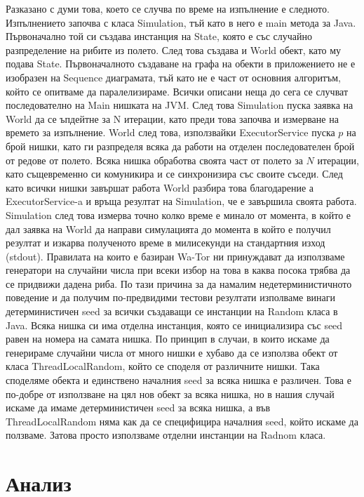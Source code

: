 \documentclass[12pt]{article}
\begin{document}
\newpage
Разказано с думи това, което се случва по време на изпълнение е следното. Изпълнението започва с класа Simulation,
тъй като в него е main метода за Java. Първоначално той си създава инстанция на State, която е със случайно
разпределение на рибите из полето. След това създава и World обект, като му подава State. Първоначалното
създаване на графа на обекти в приложението не е изобразен на Sequence диаграмата, тъй като не е част от основния
алгоритъм, който се опитваме да паралелизираме. Всички описани неща до сега се случват последователно на
Main нишката на JVM. След това Simulation пуска заявка на World да се ъпдейтне за N итерации, като преди това
започва и измерване на времето за изпълнение. World след това, използвайки ExecutorService пуска $p$ на брой
нишки, като ги разпределя всяка да работи на отделен последователен брой от редове от полето. Всяка нишка
обработва своята част от полето за $N$ итерации, като същевременно си комуникира и се синхронизира със своите
съседи. След като всички нишки завършат работа World разбира това благодарение а ExecutorService-a и
връща резултат на Simulation, че е завършила своята работа. Simulation след това измерва точно колко време
е минало от момента, в който е дал заявка на World да направи симулацията до момента в който е получил
резултат и изкарва полученото време в милисекунди на стандартния изход (stdout).
\bigbreak
Правилата на които е базиран Wa-Tor ни принуждават да използваме генератори на случайни числа при всеки избор на това
в каква посока трябва да се придвижи дадена риба. По тази причина за да намалим недетерминистичното поведение
и да получим по-предвидими тестови резултати изполваме винаги детерминистичен seed за всички създаващи се инстанции
на Random класа в Java. Всяка нишка си има отделна инстанция, която се инициализира със seed равен на номера на самата нишка.
По принцип в случаи, в които искаме да генерираме случайни числа от много нишки е хубаво да се използва
обект от класа ThreadLocalRandom, който се споделя от различните нишки. Така споделяме обекта и единствено
началния seed за всяка нишка е различен. Това е по-добре от използване на цял нов обект за всяка нишка,
но в нашия случай искаме да имаме детерминистичен seed за всяка нишка, а във ThreadLocalRandom няма 
как да се специфицира началния seed, който искаме да ползваме. Затова просто използваме отделни инстанции
на Radnom класа.

\newpage

\section{Анализ}
\end{document}
